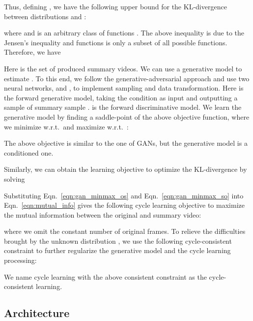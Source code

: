 \documentclass[letterpaper]{article} \usepackage{aaai19}  \usepackage{times}  \usepackage{helvet}  \usepackage{courier}  \usepackage{url}  \usepackage{graphicx}  \frenchspacing  \setlength{\pdfpagewidth}{8.5in}  \setlength{\pdfpageheight}{11in}  \usepackage{amsmath}
\begin{document}
Thus, defining ,  we have the following upper bound for the KL-divergence between distributions  and :

where  and  is an arbitrary class of functions . The above inequality is due to the Jensen's inequality and functions  is only a subset of all possible functions.  Therefore, we have

Here  is the set of produced summary videos. We can use a generative model to estimate  . To this end, we follow the generative-adversarial approach \cite{goodfellow2014generative} and use two neural networks,  and , to implement sampling and data transformation.  Here  is the forward generative model, taking the condition  as input and outputting a sample of summary sample .  is the forward discriminative model.  We  learn the generative model  by finding a saddle-point of the above objective function, where we minimize w.r.t.\  and maximize w.r.t.\ :

The above objective is similar to the one of GANs, but the generative model is a conditioned one.  

Similarly, we can obtain the learning objective to optimize the KL-divergence  by solving

Substituting Eqn.~\eqref{eqn:gan_minmax_os} and Eqn.~\eqref{eqn:gan_minmax_so} into Eqn.~\eqref{eqn:mutual_info} gives the following cycle learning objective to maximize the mutual information between the original and summary video:

where we omit the constant number of original frames. To relieve the difficulties brought by the unknown distribution , we use the following cycle-consistent constraint to further regularize the generative model and the cycle learning processing:

We name cycle learning with the above consistent constraint as the cycle-consistent learning.



\subsection{Architecture}
\end{document}
